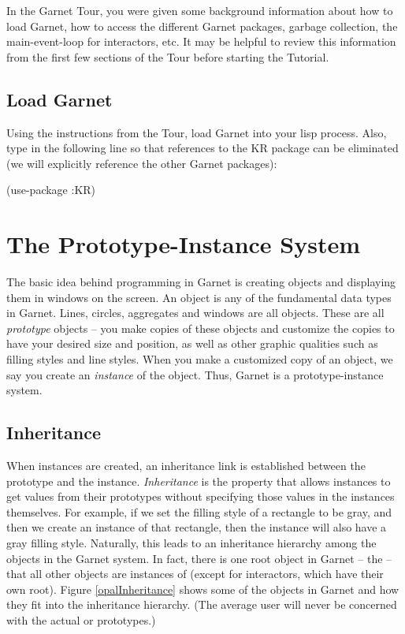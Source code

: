 In the Garnet Tour, you were given some background information about
how to load Garnet, how to access the different Garnet packages,
garbage collection, the main-event-loop for interactors, etc.  It may
be helpful to review this information from the first few sections of
the Tour before starting the Tutorial.


\section{Load Garnet}

Using the instructions from the Tour, load Garnet into your lisp
process.  Also, type in the following line so that references to
the KR package can be eliminated (we will explicitly reference the
other Garnet packages):

\begin{programexample}
(use-package :KR)
\end{programexample}


\chapter{The Prototype-Instance System}

The basic idea behind programming in Garnet is creating objects
and displaying them in windows on the screen.
An object is any of the fundamental data types in Garnet.  Lines,
circles, aggregates and windows are all objects.  These are all
{\it prototype} objects -- you make copies of these objects and
customize the copies to have your desired size and position, as well
as other graphic qualities such as filling styles and line styles.
When you make a customized copy of an object, we say you create an
{\it instance} of the object.  Thus, Garnet is a prototype-instance system.


\section{Inheritance}
\label{inheritance}

When instances are created, an inheritance link is established between
the prototype and the instance.  {\it Inheritance} is the property that
allows instances to get values from their prototypes without specifying
those values in the instances themselves.  For example, if we set the
filling style of a rectangle to be gray, and then we create an
instance of that rectangle, then the instance will also have a gray
filling style.  Naturally, this leads to an inheritance hierarchy
among the objects in the Garnet system.
In fact, there is one root object in Garnet -- the  -- that
all other objects are instances of (except for interactors, which have
their own root).  Figure \ref{opalInheritance}
shows some of the objects in Garnet and how they fit into the
inheritance hierarchy.  (The average user will never be concerned with
the actual  or  prototypes.)

